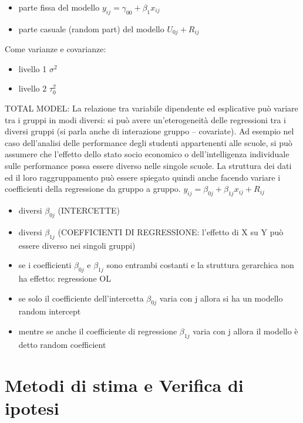 \documentclass[a4page, 11pt]{article} %
\begin{document}
\begin{itemize}
\item parte fissa del modello $y_{ij}=\gamma_{00}+\beta_1 x_{ij}$
\item parte casuale (random part) del modello $U_{0j}+ R_{ij}$
\end{itemize}
Come varianze e covarianze:
\begin{itemize}
\item livello 1 $\sigma^{2}$
\item livello 2 $\tau^{2}_0$
\end{itemize}
TOTAL MODEL: 
\newline
La relazione tra variabile dipendente ed esplicative può variare tra i gruppi in modi diversi: si può avere un’eterogeneità delle regressioni tra i diversi gruppi (si parla anche di interazione gruppo – covariate). Ad esempio nel caso dell’analisi delle performance degli studenti appartenenti alle scuole, si può assumere che l’effetto dello stato socio economico o dell’intelligenza individuale sulle performance possa essere diverso nelle singole scuole.
\newline
La struttura dei dati ed il loro raggruppamento può essere spiegato quindi anche facendo variare i coefficienti della regressione da gruppo a gruppo.
\newline
$y_{ij}=\beta_{0j}+\beta_{1j} x_{ij}+ R_{ij}$
\begin{itemize}
\item diversi $\beta_{0j}$ (INTERCETTE)
\item diversi $\beta_{1j}$ (COEFFICIENTI DI REGRESSIONE: l’effetto di X su Y può essere diverso nei singoli gruppi)
\item se i coefficienti $\beta_{0j}$ e $\beta_{1j}$ sono entrambi costanti e la struttura gerarchica non ha effetto: regressione OL
\item se solo il coefficiente dell’intercetta $\beta_{0j}$ varia con j allora si ha un modello random intercept
\item mentre se anche il coefficiente di regressione $\beta_{1j}$ varia con j allora il modello è detto random coefficient
\end{itemize}

\section{Metodi di stima e Verifica di ipotesi}
\end{document}
